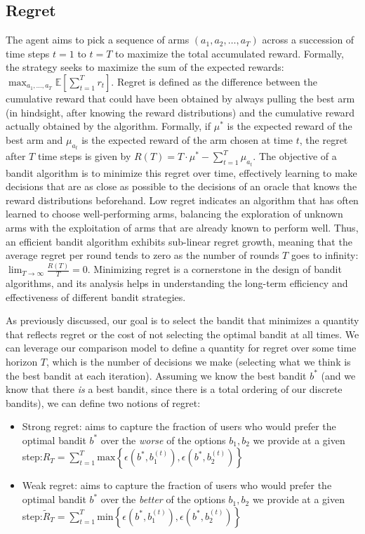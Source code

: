 \documentclass[
  letterpaper,
  DIV=11,
  numbers=noendperiod,
  oneside]{scrreprt}
\theoremstyle{remark}
\begin{document}
\subsection{Regret}\label{regret}

The agent aims to pick a sequence of arms \((a_1, a_2, \ldots, a_T)\)
across a succession of time steps \(t = 1\) to \(t = T\) to maximize the
total accumulated reward. Formally, the strategy seeks to maximize the
sum of the expected rewards:
\(\max_{a_1, \ldots, a_T} \mathbb{E} \left[\sum_{t=1}^{T} r_t\right]\).
Regret is defined as the difference between the cumulative reward that
could have been obtained by always pulling the best arm (in hindsight,
after knowing the reward distributions) and the cumulative reward
actually obtained by the algorithm. Formally, if \(\mu^*\) is the
expected reward of the best arm and \(\mu_{a_t}\) is the expected reward
of the arm chosen at time \(t\), the regret after \(T\) time steps is
given by \(R(T) = T \cdot \mu^* - \sum_{t=1}^{T} \mu_{a_t}\). The
objective of a bandit algorithm is to minimize this regret over time,
effectively learning to make decisions that are as close as possible to
the decisions of an oracle that knows the reward distributions
beforehand. Low regret indicates an algorithm that has often learned to
choose well-performing arms, balancing the exploration of unknown arms
with the exploitation of arms that are already known to perform well.
Thus, an efficient bandit algorithm exhibits sub-linear regret growth,
meaning that the average regret per round tends to zero as the number of
rounds \(T\) goes to infinity:
\(\lim_{T \to \infty} \frac{R(T)}{T} = 0\). Minimizing regret is a
cornerstone in the design of bandit algorithms, and its analysis helps
in understanding the long-term efficiency and effectiveness of different
bandit strategies.

As previously discussed, our goal is to select the bandit that minimizes
a quantity that reflects regret or the cost of not selecting the optimal
bandit at all times. We can leverage our comparison model to define a
quantity for regret over some time horizon \(T\), which is the number of
decisions we make (selecting what we think is the best bandit at each
iteration). Assuming we know the best bandit \(b^*\) (and we know that
there \emph{is} a best bandit, since there is a total ordering of our
discrete bandits), we can define two notions of regret:

\begin{itemize}
\item
  Strong regret: aims to capture the fraction of users who would prefer
  the optimal bandit \(b^*\) over the \emph{worse} of the options
  \(b_1, b_2\) we provide at a given
  step:\(R_T = \sum_{t = 1}^T \text{max} \left\{ \epsilon(b^*, b_1^{(t)}), \epsilon(b^*, b_2^{(t)}) \right\}\)
\item
  Weak regret: aims to capture the fraction of users who would prefer
  the optimal bandit \(b^*\) over the \emph{better} of the options
  \(b_1, b_2\) we provide at a given
  step:\(\tilde{R}_T = \sum_{t = 1}^T \text{min} \left\{ \epsilon(b^*, b_1^{(t)}), \epsilon(b^*, b_2^{(t)}) \right\}\)
\end{itemize}
\end{document}
